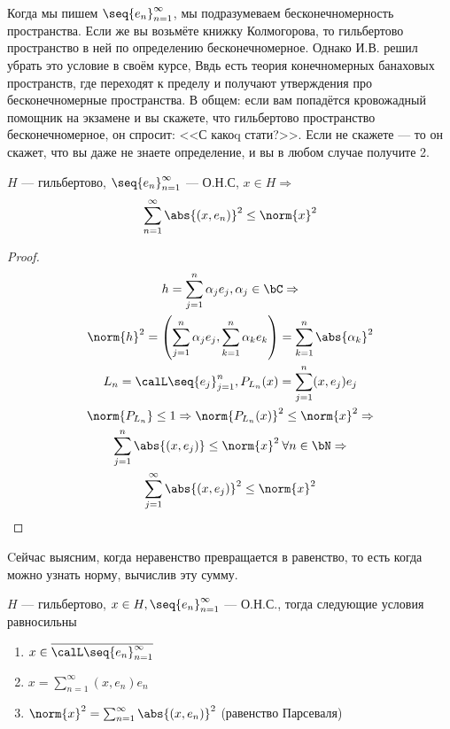\documentclass[document]{subfiles}
\begin{document}
Когда мы пишем $\seq{e_n}^\infty_{n=1}$, мы подразумеваем бесконечномерность пространства. Если же вы возьмёте книжку Колмогорова, то гильбертово пространство в ней по определению бесконечномерное. Однако И.В. решил убрать это условие в своём курсе,
Ввдь есть теория конечномерных банаховых пространств, где переходят к пределу
и получают утверждения про бесконечномерные пространства. В общем: если вам попадётся кровожадный помощник на экзамене и вы скажете, что гильбертово пространство бесконечномерное, он спросит: <<С какоq стати?>>. Если не скажете --- то он скажет, что вы даже не знаете определение,
и вы в любом случае получите 2.
\begin{corollary}
    $H$ --- гильбертово, $\seq{e_n}^\infty_{n=1}$ --- О.Н.С, $x \in H \Rightarrow$
    \[ \sum^\infty_{n=1} \abs{(x,e_n)}^2 \leq \norm{x}^2 \] 
\end{corollary}
\begin{proof}
    \begin{gather*}
        h = \sum^n_{j=1} \alpha_j e_j, \alpha_j \in \bC \Rightarrow \\
        \norm{h}^2 = \left( \sum^n_{j=1} \alpha_j e_j, \sum^n_{k=1} \alpha_k e_k \right) = \sum^n_{k=1} \abs{\alpha_k}^2 \\
        L_n = \calL \seq{e_j}^n_{j=1}, P_{L_n}(x) = \sum^n_{j=1} (x, e_j) e_j \\
        \norm{P_{L_n}} \leq 1 \Rightarrow \norm{P_{L_n}(x)}^2 \leq \norm{x}^2 \Rightarrow \\
        \sum^n_{j=1} \abs{(x,e_j)} \leq \norm{x}^2 \: \forall n \in \bN \Rightarrow \\
        \sum^\infty_{j=1} \abs{(x,e_j)}^2 \leq \norm{x}^2
    \end{gather*}
\end{proof}

Cейчас выясним, когда неравенство превращается в равенство, то есть когда можно узнать норму, вычислив эту сумму.


\begin{theorem}
    $H$ --- гильбертово, $x \in H, \seq{e_n}^\infty_{n=1}$ --- О.Н.С., тогда следующие условия равносильны
    \begin{enumerate}
        \item $x \in \overline{\calL \seq{e_n}^\infty_{n=1}} $
        \item $x = \sum^\infty_{n=1} (x,e_n) e_n $
        \item $\norm{x}^2 = \sum^\infty_{n=1} \abs{(x,e_n)}^2$ (равенство Парсеваля)
    \end{enumerate}
\end{theorem}
\end{document}

